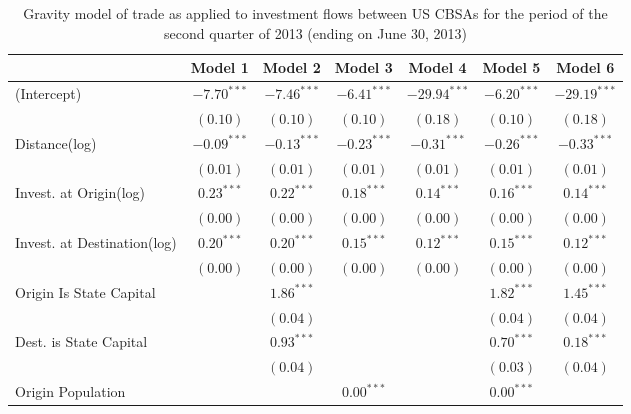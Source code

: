 \begin{table} 
	\begin{center}
	\small
		\caption[Gravity Model of Trade for Q2 2013]{Gravity model of trade as applied to investment flows between US CBSAs for the period of the second quarter of 2013 (ending on June 30, 2013)}
		\begin{tabular}{l c c c c c c }
			\hline
			& Model 1 & Model 2 & Model 3 & Model 4 & Model 5 & Model 6 \\
			\hline
			(Intercept)                  & $-7.70^{***}$ & $-7.46^{***}$ & $-6.41^{***}$ & $-29.94^{***}$ & $-6.20^{***}$ & $-29.19^{***}$ \\
			& $(0.10)$      & $(0.10)$      & $(0.10)$      & $(0.18)$       & $(0.10)$      & $(0.18)$       \\
			Distance(log)                   & $-0.09^{***}$ & $-0.13^{***}$ & $-0.23^{***}$ & $-0.31^{***}$  & $-0.26^{***}$ & $-0.33^{***}$  \\
			& $(0.01)$      & $(0.01)$      & $(0.01)$      & $(0.01)$       & $(0.01)$      & $(0.01)$       \\
			Invest. at Origin(log)                  & $0.23^{***}$  & $0.22^{***}$  & $0.18^{***}$  & $0.14^{***}$   & $0.16^{***}$  & $0.14^{***}$   \\
			& $(0.00)$      & $(0.00)$      & $(0.00)$      & $(0.00)$       & $(0.00)$      & $(0.00)$       \\
			Invest. at Destination(log)                 & $0.20^{***}$  & $0.20^{***}$  & $0.15^{***}$  & $0.12^{***}$   & $0.15^{***}$  & $0.12^{***}$   \\
			& $(0.00)$      & $(0.00)$      & $(0.00)$      & $(0.00)$       & $(0.00)$      & $(0.00)$       \\
			Origin Is State Capital          &               & $1.86^{***}$  &               &                & $1.82^{***}$  & $1.45^{***}$   \\
			&               & $(0.04)$      &               &                & $(0.04)$      & $(0.04)$       \\
			Dest. is State Capital     &               & $0.93^{***}$  &               &                & $0.70^{***}$  & $0.18^{***}$   \\
			&               & $(0.04)$      &               &                & $(0.03)$      & $(0.04)$       \\
			Origin Population           &               &               & $0.00^{***}$  &                & $0.00^{***}$  &                \\

\end{tabular}
\end{center}
\end{table}
